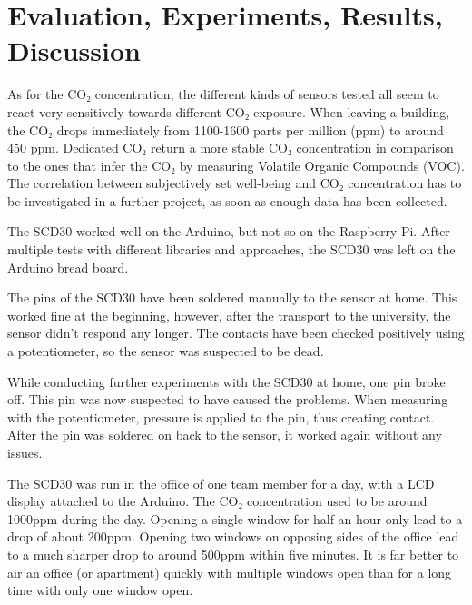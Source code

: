 \section{Evaluation, Experiments, Results, Discussion}

As for the CO₂ concentration, the different kinds of sensors tested all seem to react very sensitively towards different CO₂ exposure. When leaving a building, the CO₂ drops immediately from 1100-1600 parts per million (ppm) to around 450 ppm. Dedicated CO₂ return a more stable CO₂ concentration in comparison to the ones that infer the CO₂ by measuring Volatile Organic Compounds (VOC). The correlation between subjectively set well-being and CO₂ concentration has to be investigated in a further project, as soon as enough data has been collected. 

The SCD30 worked well on the Arduino, but not so on the Raspberry Pi. After multiple tests with different libraries and approaches, the SCD30 was left on the Arduino bread board.

The pins of the SCD30 have been soldered manually to the sensor at home. This worked fine at the beginning, however, after the transport to the university, the sensor didn't respond any longer. The contacts have been checked positively using a potentiometer, so the sensor was suspected to be dead.

While conducting further experiments with the SCD30 at home, one pin broke off. This pin was now suspected to have caused the problems. When measuring with the potentiometer, pressure is applied to the pin, thus creating contact. After the pin was soldered on back to the sensor, it worked again without any issues.

The SCD30 was run in the office of one team member for a day, with a LCD display attached to the Arduino. The CO₂ concentration used to be around 1000ppm during the day. Opening a single window for half an hour only lead to a drop of about 200ppm. Opening two windows on opposing sides of the office lead to a much sharper drop to around 500ppm within five minutes. It is far better to air an office (or apartment) quickly with multiple windows open than for a long time with only one window open.

